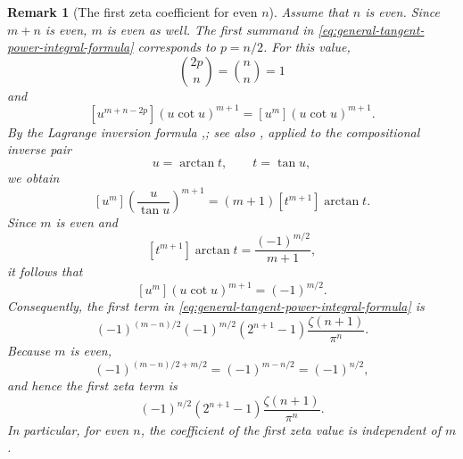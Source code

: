 \documentclass[11pt,twoside]{article}
\newtheorem{remark}[theorem]{Remark}
\numberwithin{equation}{section}
\begin{document}
\begin{remark}[The first zeta coefficient for even \(n\)] Assume that \(n\) is even. Since \(m+n\) is even, \(m\) is even as well. The first summand in \eqref{eq:general-tangent-power-integral-formula} corresponds to \(p=n/2\). For this value, \[ \binom{2p}{n}=\binom{n}{n}=1 \] and \[ [u^{m+n-2p}](u\cot u)^{m+1} = [u^m](u\cot u)^{m+1}. \] By the Lagrange inversion  formula \textnormal{\cite{SuryaWarnke2023},\cite[Theorem~5.4.2]{Stanley2023}; see also \cite{Gessel2016}}, applied to the compositional inverse pair \[ u=\arctan t, \qquad t=\tan u, \] we obtain \[ [u^m]\left(\frac{u}{\tan u}\right)^{m+1} = (m+1)[t^{m+1}]\arctan t. \] Since \(m\) is even and \[ [t^{m+1}]\arctan t = \frac{(-1)^{m/2}}{m+1}, \] it follows that \[ [u^m](u\cot u)^{m+1} = (-1)^{m/2}. \] Consequently, the first term in \eqref{eq:general-tangent-power-integral-formula} is \[ (-1)^{(m-n)/2}(-1)^{m/2} (2^{n+1}-1)\frac{\zeta(n+1)}{\pi^n}. \] Because \(m\) is even, \[ (-1)^{(m-n)/2+m/2} = (-1)^{m-n/2} = (-1)^{n/2}, \] and hence the first zeta term is \[ (-1)^{n/2} (2^{n+1}-1)\frac{\zeta(n+1)}{\pi^n}. \] In particular, for even \(n\), the coefficient of the first zeta value is independent of \(m\). \end{remark}
\end{document}
